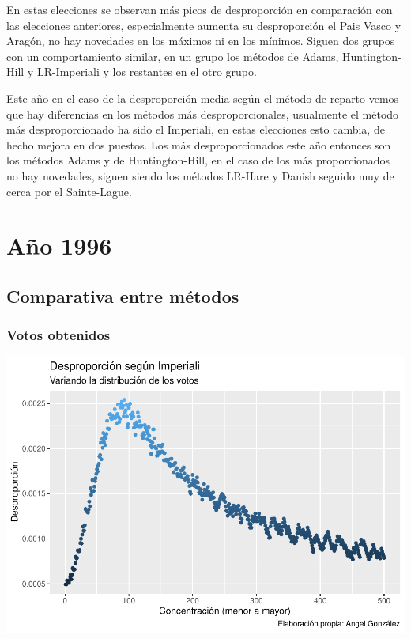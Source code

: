 \documentclass[12pt,a4paper,]{book}
\numberwithin{dummy}{section}
\theoremstyle{ocrenumbox}
\theoremstyle{blacknumex}
\theoremstyle{blacknumbox}
\theoremstyle{ocrenum}
\theoremstyle{ocrenum}
\begin{document}
En estas elecciones se observan más picos de desproporción en
comparación con las elecciones anteriores, especialmente aumenta su
desproporción el Pais Vasco y Aragón, no hay novedades en los máximos ni
en los mínimos. Siguen dos grupos con un comportamiento similar, en un
grupo los métodos de Adams, Huntington-Hill y LR-Imperiali y los
restantes en el otro grupo.

Este año en el caso de la desproporción media según el método de reparto
vemos que hay diferencias en los métodos más desproporcionales,
usualmente el método más desproporcionado ha sido el Imperiali, en estas
elecciones esto cambia, de hecho mejora en dos puestos. Los más
desproporcionados este año entonces son los métodos Adams y de
Huntington-Hill, en el caso de los más proporcionados no hay novedades,
siguen siendo los métodos LR-Hare y Danish seguido muy de cerca por el
Sainte-Lague.

\hypertarget{auxf1o-1996}{%
\section{Año 1996}\label{auxf1o-1996}}

\hypertarget{comparativa-entre-muxe9todos-6}{%
\subsection{Comparativa entre
métodos}\label{comparativa-entre-muxe9todos-6}}

\hypertarget{votos-obtenidos-6}{%
\subsubsection{Votos obtenidos}\label{votos-obtenidos-6}}

\begin{center}\includegraphics[width=1\linewidth]{figurasR/unnamed-chunk-23-1} \end{center}
\end{document}
